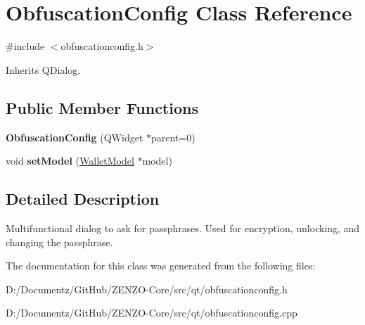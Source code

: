 \hypertarget{class_obfuscation_config}{}\section{Obfuscation\+Config Class Reference}
\label{class_obfuscation_config}


{\ttfamily \#include $<$obfuscationconfig.\+h$>$}



Inherits Q\+Dialog.

\subsection*{Public Member Functions}
\begin{DoxyCompactItemize}
\item 
\mbox{\label{class_obfuscation_config_ac94fd63ade751965b53de75df22aa499}} 
{\bfseries Obfuscation\+Config} (Q\+Widget $\ast$parent=0)
\item 
\mbox{\label{class_obfuscation_config_a508b1f36b1358567e7d0d506950dc75d}} 
void {\bfseries set\+Model} (\mbox{\hyperlink{class_wallet_model}{Wallet\+Model}} $\ast$model)
\end{DoxyCompactItemize}


\subsection{Detailed Description}
Multifunctional dialog to ask for passphrases. Used for encryption, unlocking, and changing the passphrase. 

The documentation for this class was generated from the following files\+:\begin{DoxyCompactItemize}
\item 
D\+:/\+Documentz/\+Git\+Hub/\+Z\+E\+N\+Z\+O-\/\+Core/src/qt/obfuscationconfig.\+h\item 
D\+:/\+Documentz/\+Git\+Hub/\+Z\+E\+N\+Z\+O-\/\+Core/src/qt/obfuscationconfig.\+cpp\end{DoxyCompactItemize}
